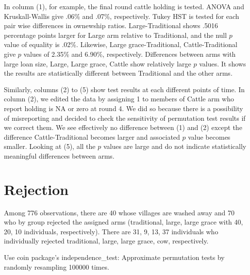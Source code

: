 In column (1), for example, the final round cattle holding is tested. ANOVA and Kruskall-Wallis give .06\% and .07\%, respectively. Tukey HST is tested for each pair wise differences in ownewship ratios. \textsf{Large-Traditional} shows .5016 percentage points larger for \textsf{Large} arm relative to \textsf{Traditional}, and the null $p$ value of equality is .02\%. Likewise, \textsf{Large grace-Traditional, Cattle-Traditional} give $p$ values of 2.35\% and 6.90\%, respectively. Differences between arms with large loan size, \textsf{Large, Large grace, Cattle} show relatively large $p$ values. It shows the results are statistically different between \textsf{Traditional} and the other arms. 

Similarly, columns (2) to (5) show test results at each different points of time. In column (2), we edited the data by assigning 1 to members of \textsf{Cattle} arm who report holding is NA or zero at round 4. We did so because there is a possibility of misreporting and decided to check the sensitivity of permutation test results if we correct them. We see effectively no difference between (1) and (2) except the difference \textsf{Cattle-Traditional} becomes larger and associated $p$ value becomes smaller. Looking at (5), all the $p$ values are large and do not indicate statistically meaningful differences between arms.


\section{Rejection}
\label{AppSecRejection}
\setcounter{table}{0}



Among 776 observations, there are 40 whose villages are washed away and 70 who by group rejected the assigned arms (traditional, large, large grace with 40, 20, 10 individuals, respectively). There are 31, 9, 13, 37 individuals who individually rejected traditional, large, large grace, cow, respectively. %


Use \textsf{coin} package's \textsf{independence\_test}: Approximate permutation tests by randomly resampling 100000 times.





